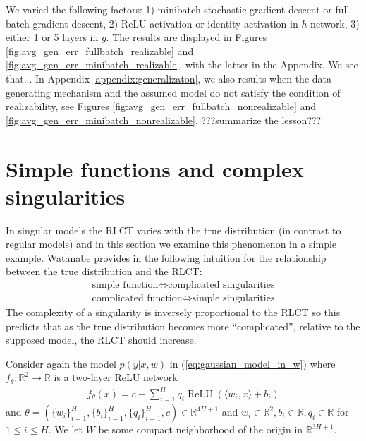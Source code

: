 \documentclass{article} %
\begin{document}
We varied the following factors: 1) minibatch stochastic gradient descent or full batch gradient descent, 2) ReLU activation or identity activation in $h$ network, 3) either 1 or 5 layers in $g$. 
The results are displayed in Figures \ref{fig:avg_gen_err_fullbatch_realizable} and \ref{fig:avg_gen_err_minibatch_realizable}, with the latter in the Appendix. We see that...
In Appendix \ref{appendix:generalizaton}, we also results when the data-generating mechanism and the assumed model do not satisfy the condition of realizability, see Figures \ref{fig:avg_gen_err_fullbatch_nonrealizable} and \ref{fig:avg_gen_err_minibatch_nonrealizable}. ???summarize the lesson???



\section{Simple functions and complex singularities}\label{section:simple_func}

In singular models the RLCT varies with the true distribution (in contrast to regular models) and in this section we examine this phenomenon in a simple example. Watanabe provides in \citep[\S 7.6]{watanabe_algebraic_2009} the following intuition for the relationship between the true distribution and the RLCT:
\begin{align*}
\text{simple function} \iff \text{complicated singularities}\\
\text{complicated function} \iff \text{simple singularities}
\end{align*}
The complexity of a singularity is inversely proportional to the RLCT so this predicts that as the true distribution becomes more ``complicated'', relative to the supposed model, the RLCT should increase. %

Consider again the model $p(y|x,w)$ in (\ref{eq:gaussian_model_in_w}) where $f_\theta: \mathbb{R}^2 \longrightarrow \mathbb{R}$ is a two-layer ReLU network
\begin{gather*}
f_\theta(x) = c + \sum_{i=1}^H q_i \operatorname{ReLU}( \langle w_i, x \rangle + b_i )
\end{gather*}
and $\theta = (\{w_i\}_{i=1}^H, \{b_i\}_{i=1}^H, \{q_i\}_{i=1}^H, c) \in \mathbb{R}^{4H+1}$ and $w_i \in \mathbb{R}^2, b_i \in \mathbb{R}, q_i \in \mathbb{R}$ for $1 \le i \le H$. We let $W$ be some compact neighborhood of the origin in $\mathbb{R}^{3H+1}$.
\end{document}
